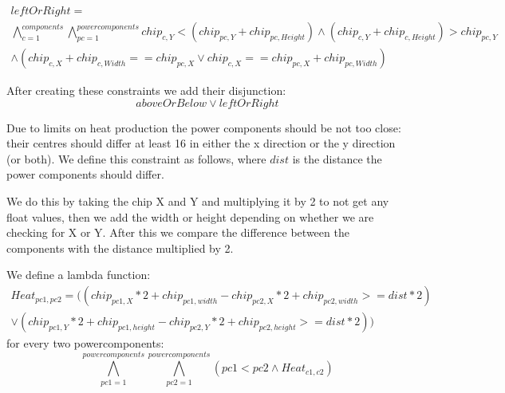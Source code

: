 \documentclass[12pt]{article}
\begin{document}
\[ \begin{array}{c} leftOrRight =\\  \bigwedge_{c=1}^{components} \bigwedge_{pc=1}^{powercomponents} chip_{c,Y} < (chip_{pc,Y} + chip_{pc,Height})  \land (chip_{c,Y} + chip_{c,Height}) > chip_{pc,Y} \\
\land (chip_{c,X} + chip_{c,Width} == chip_{pc,X} \lor chip_{c,X} == chip_{pc,X} + chip_{pc,Width})
\end{array} \]

After creating these constraints we add their disjunction:
\[ aboveOrBelow \lor leftOrRight \]


Due to limits on heat production the power components should be not too close: their centres should differ at least 16 in either the x direction or the y direction (or both).
We define this constraint as follows, where $dist$ is the distance the power components should differ.

We do this by taking the chip X and Y and multiplying it by 2 to not get any float values, then we add the width or height depending on whether we are checking for X or Y. After this we compare the difference between the components with the distance multiplied by 2.

We define a lambda function:
\[ \begin{array}{c} Heat_{pc1,pc2} = ((chip_{pc1,X} * 2 + chip_{pc1,width} - chip_{pc2,X} * 2 + chip_{pc2,width} >= dist * 2)\\
\lor  (chip_{pc1,Y} * 2 + chip_{pc1,height} - chip_{pc2,Y} * 2 + chip_{pc2,height} >= dist * 2))
\end{array} \]
for every two powercomponents:
\[ \bigwedge_{pc1=1}^{powercomponents} \bigwedge_{pc2=1}^{powercomponents} \left( pc1 < pc2 \land Heat_{c1,c2}\right)  \]
\end{document}
